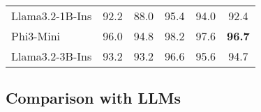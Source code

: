 \begin{table}[]
\begin{adjustbox}{max width=1\columnwidth}
\begin{tabular}{lccccc}
Llama3.2-1B-Ins    & 92.2 & 88.0                          & 95.4   & 94.0    & 92.4    \\
Phi3-Mini          & 96.0 & 94.8                          & 98.2   & 97.6    & \textbf{96.7}    \\ 
Llama3.2-3B-Ins    & 93.2 & 93.2                          & 96.6   & 95.6    & 94.7    \\ \hline
\end{tabular}
\end{adjustbox}
\caption{}
\label{tab:fact}
\end{table}


\subsection{Comparison with LLMs}




